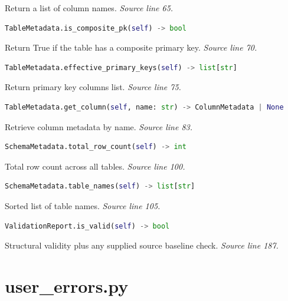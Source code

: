 {\small Return a list of column names. \textit{Source line 65.}}



\begin{lstlisting}[language=Python]
TableMetadata.is_composite_pk(self) -> bool
\end{lstlisting}


{\small Return True if the table has a composite primary key. \textit{Source line 70.}}



\begin{lstlisting}[language=Python]
TableMetadata.effective_primary_keys(self) -> list[str]
\end{lstlisting}


{\small Return primary key columns list. \textit{Source line 75.}}



\begin{lstlisting}[language=Python]
TableMetadata.get_column(self, name: str) -> ColumnMetadata | None
\end{lstlisting}


{\small Retrieve column metadata by name. \textit{Source line 83.}}



\begin{lstlisting}[language=Python]
SchemaMetadata.total_row_count(self) -> int
\end{lstlisting}


{\small Total row count across all tables. \textit{Source line 100.}}



\begin{lstlisting}[language=Python]
SchemaMetadata.table_names(self) -> list[str]
\end{lstlisting}


{\small Sorted list of table names. \textit{Source line 105.}}



\begin{lstlisting}[language=Python]
ValidationReport.is_valid(self) -> bool
\end{lstlisting}


{\small Structural validity plus any supplied source baseline check. \textit{Source line 187.}}

\section{user\_errors.py}

